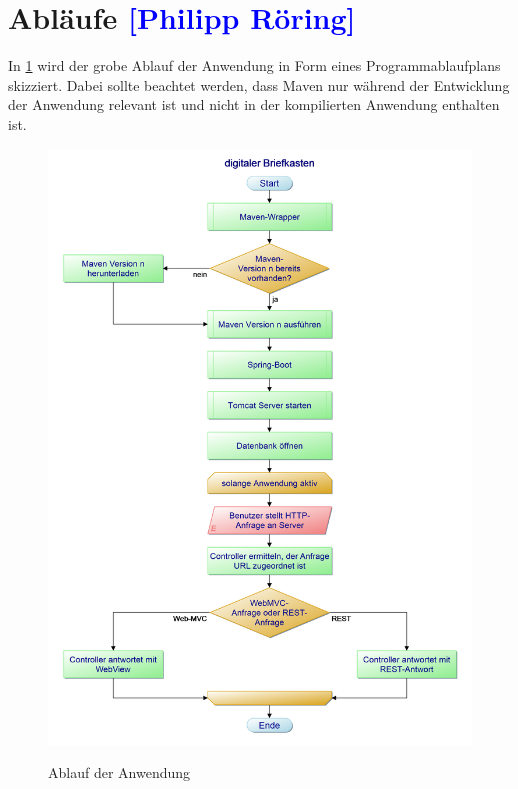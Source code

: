 

\section{Abläufe \textcolor{blue}{[Philipp Röring]}}

In \cref{fig:digitaler-briefkasten-pap} wird der grobe Ablauf der Anwendung in Form eines Programmablaufplans skizziert.
Dabei sollte beachtet werden, dass Maven nur während der Entwicklung der Anwendung relevant ist und nicht in der kompilierten
Anwendung enthalten ist.

\begin{figure}[h!!]
    \centering
    \begin{minipage}[t]{0.7\textwidth}
        \caption{Ablauf der Anwendung}
        \includegraphics[width=1\textwidth]{img/digitaler-Briefkasten-pap.png}\\
        \label{fig:digitaler-briefkasten-pap}
    \end{minipage}
\end{figure}







